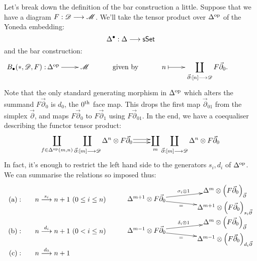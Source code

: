 \documentclass[11pt]{article}
\begin{document}
\begin{5. The unreasonably effective (co)bar construction}
\begin{shaded}
Let's break down the definition of the bar construction a little. Suppose that we have a diagram $F:\mathscr{D}\longrightarrow\mathscr{M}$. We'll take the tensor product over $\Delta^{\textup{op}}$ of the Yoneda embedding:
\[\Delta^\bullet :\Delta\longrightarrow\operatorname{{\mathsf{sSet}}}
\]
and the bar construction:
\[\qquad \vcenter{\xymatrix@R=0mm{
\makebox[0cm][r]{ $B_\bullet (*,\scrd,F):$\,}\ar[r]%
\Delta^{\op}&%
\scrm&\textup{ given by }&%
n%
\ar@{|->}[r]&
\displaystyle \coprod_{\vec\partial :[n]\to\scrd}F\vec\partial_0.%
}}
\]
Note that the only standard generating morphism in $\Delta^{\textup{op}}$ which alters the summand $F\vec\partial_0$ is $d_0$, the $0^\textup{th}$ face map. This drops the first map $\vec\partial_{01}$ from the simplex $\vec\partial$, and maps $F\vec\partial_0$ to $F\vec\partial_1$ using $F\vec\partial_{01}$. In the end, we have a coequaliser describing the functor tensor product:
\[
\vcenter{\xymatrix@1{
\displaystyle\coprod_{f\in\Delta^{\op}(m,n)}\displaystyle \coprod_{\vec\partial:[m]\to\scrd} \Delta^n\otimes F\vec\partial_0
\ar@<+.5ex>[r]
\ar@<-.5ex>[r]
&%
\displaystyle\coprod_{m} \displaystyle\coprod_{\vec\partial :[m]\to\scrd}\Delta^n\otimes F\vec\partial_0%
}}\]
In fact, it's enough to restrict the left hand side to the generators $s_i,d_i$ of $\Delta^{\textup{op}}$. We can summarise the relations so imposed thus:
\[\begin{array}{rll}
\textup{(a)}:\quad &
n\overset{s_i}{\to}n+1\ (0\leq i\leq n)\quad &
\vcenter{\xymatrix@R=.43cm@C=4cm@!0@1{
&%
\Delta^m\otimes \left(F\vec\partial_0\right)_{\vec\partial}
\\%
\Delta^{m+1}\otimes F\vec\partial_0
\ar[ur]^-{\sigma_i\otimes 1}
\ar[dr]_-{=}
&%
\\%
&%
\Delta^{m+1}\otimes \left(F\vec\partial_0\right) _{s_i\vec\partial}%
}}\\
\textup{(b)}:\quad &
n\overset{d_i}{\to}n+1\ (0<i\leq n)\qquad &
\vcenter{\xymatrix@R=.43cm@C=4cm@!0@1{
&%
\Delta^m\otimes \left(F\vec\partial_0\right)_{\vec\partial}
\\%
\Delta^{m-1}\otimes F\vec\partial_0
\ar[ur]^-{\delta_i\otimes 1}
\ar[dr]_-{=}
&%
\\%
&%
\Delta^{m-1}\otimes \left(F\vec\partial_0\right) _{d_i\vec\partial}%
}}\\
\textup{(c)}:\quad &
n\overset{d_0}{\to}n+1\qquad &
\vcenter{\xymatrix@R=.43cm@C=4cm@!0@1{
}}
\end{array}\]
\end{shaded}
\end{5. The unreasonably effective (co)bar construction}
\end{document}
